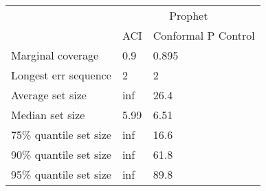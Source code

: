 \begin{tabular}{lll}
\toprule
& \multicolumn{2}{c}{Prophet} \\
& ACI & Conformal P Control \\
\midrule
Marginal coverage & 0.9 & 0.895 \\
Longest err sequence & 2 & 2 \\
Average set size & inf & 26.4 \\
Median set size & 5.99 & 6.51 \\
75\% quantile set size & inf & 16.6 \\
90\% quantile set size & inf & 61.8 \\
95\% quantile set size & inf & 89.8 \\
\bottomrule
\end{tabular}
